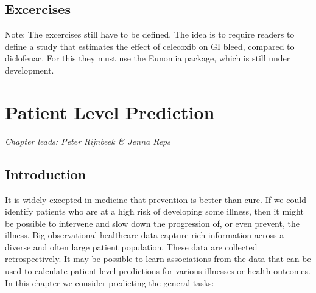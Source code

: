 \documentclass[11pt]{book}
\begin{document}
\section{Excercises}\label{excercises}

Note: The excercises still have to be defined. The idea is to require
readers to define a study that estimates the effect of celecoxib on GI
bleed, compared to diclofenac. For this they must use the Eunomia
package, which is still under development.

\chapter{Patient Level Prediction}\label{PatientLevelPrediction}

\emph{Chapter leads: Peter Rijnbeek \& Jenna Reps}

\section{Introduction}\label{introduction}

It is widely excepted in medicine that prevention is better than cure.
If we could identify patients who are at a high risk of developing some
illness, then it might be possible to intervene and slow down the
progression of, or even prevent, the illness. Big observational
healthcare data capture rich information across a diverse and often
large patient population. These data are collected retrospectively. It
may be possible to learn associations from the data that can be used to
calculate patient-level predictions for various illnesses or health
outcomes. In this chapter we consider predicting the general tasks:
\end{document}
